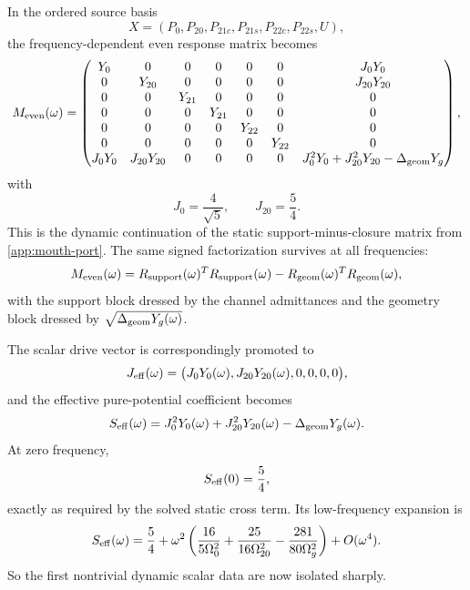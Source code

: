 \documentclass[11pt]{article}
\begin{document}
In the ordered source basis
\begin{equation}
X=(P_0,P_{20},P_{21c},P_{21s},P_{22c},P_{22s},U),
\label{eq:irred-dtn-Xbasis}
\end{equation}
the frequency-dependent even response matrix becomes
\begin{equation}
M_{\rm even}(\omega)=
\begin{pmatrix}
Y_0 & 0 & 0 & 0 & 0 & 0 & J_0Y_0\\
0 & Y_{20} & 0 & 0 & 0 & 0 & J_{20}Y_{20}\\
0 & 0 & Y_{21} & 0 & 0 & 0 & 0\\
0 & 0 & 0 & Y_{21} & 0 & 0 & 0\\
0 & 0 & 0 & 0 & Y_{22} & 0 & 0\\
0 & 0 & 0 & 0 & 0 & Y_{22} & 0\\
J_0Y_0 & J_{20}Y_{20} & 0 & 0 & 0 & 0 & J_0^2Y_0+J_{20}^2Y_{20}-\Delta_{\rm geom}Y_g
\end{pmatrix},
\label{eq:irred-dtn-Meven-omega}
\end{equation}
with
\begin{equation}
J_0=\frac{4}{\sqrt5},
\qquad
J_{20}=\frac54.
\label{eq:irred-dtn-J0J20}
\end{equation}
This is the dynamic continuation of the static support-minus-closure matrix from
\cref{app:mouth-port}.
The same signed factorization survives at all frequencies:
\begin{equation}
M_{\rm even}(\omega)
=
R_{\rm support}(\omega)^T R_{\rm support}(\omega)
-
R_{\rm geom}(\omega)^T R_{\rm geom}(\omega),
\label{eq:irred-dtn-Meven-factorized}
\end{equation}
with the support block dressed by the channel admittances and the geometry block dressed
by \(\sqrt{\Delta_{\rm geom}Y_g(\omega)}\).

The scalar drive vector is correspondingly promoted to
\begin{equation}
J_{\rm eff}(\omega)=\bigl(J_0Y_0(\omega),J_{20}Y_{20}(\omega),0,0,0,0\bigr),
\label{eq:irred-dtn-Jeff}
\end{equation}
and the effective pure-potential coefficient becomes
\begin{equation}
S_{\rm eff}(\omega)=J_0^2Y_0(\omega)+J_{20}^2Y_{20}(\omega)-\Delta_{\rm geom}Y_g(\omega).
\label{eq:irred-dtn-Seff}
\end{equation}
At zero frequency,
\begin{equation}
S_{\rm eff}(0)=\frac54,
\label{eq:irred-dtn-Seff0}
\end{equation}
exactly as required by the solved static cross term.  Its low-frequency expansion is
\begin{equation}
S_{\rm eff}(\omega)
=
\frac54
+\omega^2
\left(
\frac{16}{5\Omega_0^2}
+\frac{25}{16\Omega_{20}^2}
-\frac{281}{80\Omega_g^2}
\right)
+O(\omega^4).
\label{eq:irred-dtn-Seff-expansion}
\end{equation}
So the first nontrivial dynamic scalar data are now isolated sharply.
\end{document}
